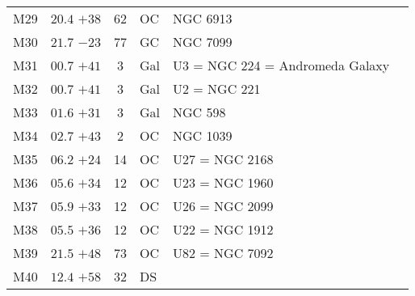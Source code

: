 \begin{table}[t]
\begin{tabular}{lcclll}
M29  &$20.4$ $+38$&62&OC &NGC 6913\\
M30  &$21.7$ $-23$&77&GC &NGC 7099\\
M31  &$00.7$ $+41$&3&Gal&U3 = NGC 224 = Andromeda Galaxy\\
M32  &$00.7$ $+41$&3&Gal&U2 = NGC 221\\
M33  &$01.6$ $+31$&3&Gal&NGC 598\\
M34  &$02.7$ $+43$&2&OC &NGC 1039\\
M35  &$06.2$ $+24$&14&OC &U27 = NGC 2168\\
M36  &$05.6$ $+34$&12&OC &U23 = NGC 1960\\
M37  &$05.9$ $+33$&12&OC &U26 = NGC 2099\\
M38  &$05.5$ $+36$&12&OC &U22 = NGC 1912\\
M39  &$21.5$ $+48$&73&OC &U82 = NGC 7092\\
M40  &$12.4$ $+58$&32&DS &\\
\hline
\end{tabular}
\end{table}

